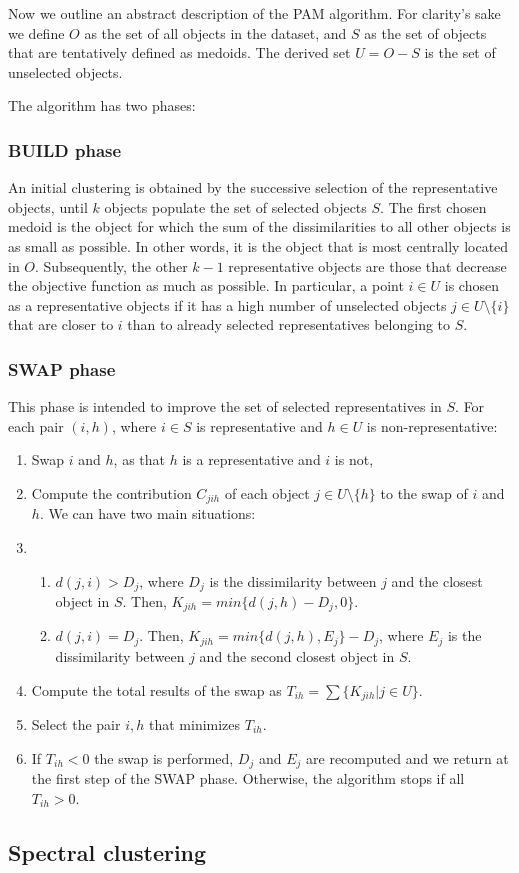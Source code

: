 Now we outline an abstract description of the PAM algorithm.\newline 
For clarity's sake we define $O$ as the set of all objects in the dataset, and $S$ as the set of objects that are tentatively defined as medoids. The derived set $U = O - S$ is the set of unselected objects.

The algorithm has two phases:

\subsubsection*{BUILD phase}
An initial clustering is obtained by the successive selection of the representative objects, until $k$ objects populate the set of selected objects $S$. The first chosen medoid is the object for which the sum of the dissimilarities to all other objects is as small as possible. In other words, it is the object that is most centrally located in $O$. Subsequently, the other $k-1$ representative objects are those that decrease the objective function as much as possible. In particular, a point $i \in U$ is chosen as a representative objects if it has a high number of unselected objects $j\in U\setminus \{i\}$ that are closer to $i$ than to already selected representatives belonging to $S$.

\subsubsection*{SWAP phase}
This phase is intended to improve the set of selected representatives in $S$.
For each pair $(i,h)$, where $i \in S$ is representative and $h \in U$ is non-representative:
\begin{enumerate}
    \item Swap $i$ and $h$, as that $h$ is a representative and $i$ is not,
    \item Compute the contribution $C_{jih}$ of each object $j \in U\setminus \{h\}$ to the swap of $i$ and $h$. We can have two main situations:
    \item \begin{enumerate}
        \item $d(j, i) > D_{j}$, where $D_{j}$ is the dissimilarity between $j$ and the closest object in $S$. Then, $K_{jih} = min\{d(j,h) - D_{j}, 0\}$.
        \item $d(j, i) = D_{j}$. Then, $K_{jih} = min\{d(j,h), E_{j}\} - D_{j}$, where $E_{j}$ is the dissimilarity between $j$ and the second closest object in $S$.
    \end{enumerate}
    \item Compute the total results of the swap as $T_{ih} = \sum\{ K_{jih} | j \in U\}$.
    \item Select the pair $i, h$ that minimizes $T_{ih}$.
    \item If $T_{ih} < 0$ the swap is performed, $D_{j}$ and $E_{j}$ are recomputed and we return at the first step of the SWAP phase. Otherwise, the algorithm stops if all $T_{ih} > 0$.
\end{enumerate}

\subsection{Spectral clustering}\label{clustering_spectral}